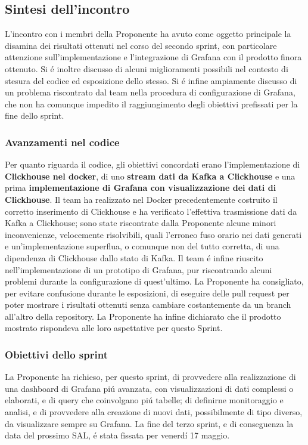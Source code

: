 \documentclass[8pt]{article}
\begin{document}
\subsection{Sintesi dell'incontro}
L'incontro con i membri della Proponente ha avuto come oggetto principale la disamina dei risultati ottenuti nel corso del secondo sprint, con particolare attenzione sull'implementazione e l'integrazione di Grafana con il prodotto finora ottenuto. Si é inoltre discusso di alcuni miglioramenti possibili nel contesto di stesura del codice ed esposizione dello stesso. Si é infine ampiamente discusso di un problema riscontrato dal team nella procedura di configurazione di Grafana, che non ha comunque impedito il raggiungimento degli obiettivi prefissati per la fine dello sprint.
\subsubsection{Avanzamenti nel codice}
Per quanto riguarda il codice, gli obiettivi concordati erano l'implementazione di \textbf{Clickhouse nel docker}, di uno \textbf{stream dati da Kafka a Clickhouse} e una prima \textbf{implementazione di Grafana con visualizzazione dei dati di Clickhouse}. Il team ha realizzato nel Docker precedentemente costruito il corretto inserimento di Clickhouse e ha verificato l'effettiva trasmissione dati da Kafka a Clickhouse; sono state riscontrate dalla Proponente alcune minori inconvenienze, velocemente risolvibili, quali l'erroneo fuso orario nei dati generati e un'implementazione superflua, o comunque non del tutto corretta, di una dipendenza di Clickhouse dallo stato di Kafka. Il team é infine riuscito nell'implementazione di un prototipo di Grafana, pur riscontrando alcuni problemi durante la configurazione di quest'ultimo. La Proponente ha consigliato, per evitare confusione durante le esposizioni, di eseguire delle pull request per poter mostrare i risultati ottenuti senza cambiare costantemente da un branch all'altro della repository. La Proponente ha infine dichiarato che il prodotto mostrato rispondeva alle loro aspettative per questo Sprint.
\subsubsection{Obiettivi dello sprint}
La Proponente ha richieso, per questo sprint, di provvedere alla realizzazione di una dashboard di Grafana piú avanzata, con visualizzazioni di dati complessi o elaborati, e di query che coinvolgano piú tabelle; di definirne monitoraggio e analisi, e di provvedere alla creazione di nuovi dati, possibilmente di tipo diverso, da visualizzare sempre su Grafana. La fine del terzo sprint, e di conseguenza la data del prossimo SAL, é stata fissata per venerdí 17 maggio. 
\end{document}
